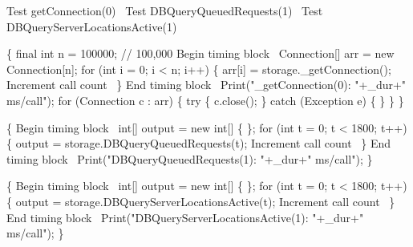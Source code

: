 \documentclass{article}
\def\nwendcode{\endtrivlist \endgroup}
\let\nwdocspar=\par
\begin{document}
\nwenddocs{}\endmoddef{}
\LA{}Test getConnection\edoc{}(0)~{\nwtagstyle{}}\RA{}
\LA{}Test \code{}DBQueryQueuedRequests\edoc{}(1)~{\nwtagstyle{}}\RA{}
\LA{}Test \code{}DBQueryServerLocationsActive\edoc{}(1)~{\nwtagstyle{}}\RA{}
\nwendcode{}\nwdocspar

\nwenddocs{}\endmoddef{}
\{
  final int n = 100000;  // 100,000
  \LA{}Begin timing block~{\nwtagstyle{}}\RA{}
  Connection[] arr = new Connection[n];
  for (int i = 0; i < n; i++) \{
    arr[i] = storage._getConnection();
    \LA{}Increment call count~{\nwtagstyle{}}\RA{}
  \}
  \LA{}End timing block~{\nwtagstyle{}}\RA{}
  Print("_getConnection(0): "+_dur+" ms/call");
  for (Connection c : arr) \{
    try \{
      c.close();
    \} catch (Exception e) \{ \}
  \}
\}
\nwendcode{}\nwdocspar

\nwenddocs{}\endmoddef{}
\{
  \LA{}Begin timing block~{\nwtagstyle{}}\RA{}
  int[] output = new int[] \{ \};
  for (int t = 0; t < 1800; t++) \{
    output = storage.DBQueryQueuedRequests(t);
    \LA{}Increment call count~{\nwtagstyle{}}\RA{}
  \}
  \LA{}End timing block~{\nwtagstyle{}}\RA{}
  Print("DBQueryQueuedRequests(1): "+_dur+" ms/call");
\}
\nwendcode{}\nwdocspar

\nwenddocs{}\endmoddef{}
\{
  \LA{}Begin timing block~{\nwtagstyle{}}\RA{}
  int[] output = new int[] \{ \};
  for (int t = 0; t < 1800; t++) \{
    output = storage.DBQueryServerLocationsActive(t);
    \LA{}Increment call count~{\nwtagstyle{}}\RA{}
  \}
  \LA{}End timing block~{\nwtagstyle{}}\RA{}
  Print("DBQueryServerLocationsActive(1): "+_dur+" ms/call");
\}
\nwendcode{}\nwdocspar
\end{document}
